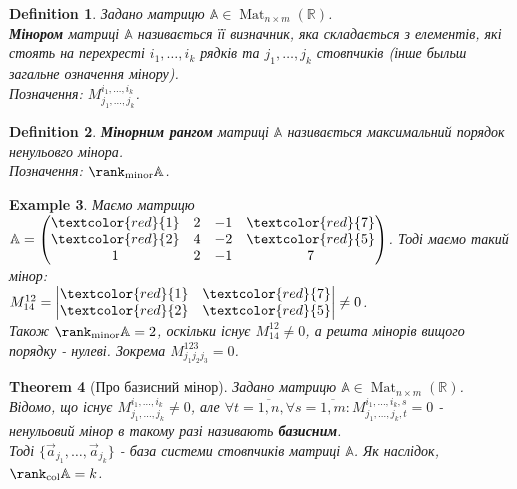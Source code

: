 \documentclass[a4paper, 10pt]{article}
\theoremstyle{theoremdd}
\newtheorem{theorem}{Theorem}[subsection]
\newtheorem{definition}[theorem]{Definition}
\newtheorem{example}[theorem]{Example}
\DeclareMathOperator{\Mat}{Mat}
\begin{document}
\begin{definition}
Задано матрицю $\mathbb{A} \in \Mat_{n \times m}(\mathbb{R})$.\\
\textbf{Мінором} матриці $\mathbb{A}$ називається її визначник, яка складається з елементів, які стоять на перехресті $i_1,\dots,i_k$ рядків та $j_1,\dots,j_k$ стовпчиків (інше быльш загальне означення мінору).\\
Позначення: $M_{j_1,\dots,j_k}^{i_1,\dots,i_k}$.
\end{definition}

\begin{definition}
\textbf{Мінорним рангом} матриці $\mathbb{A}$ називається максимальний порядок ненульовго мінора.\\
Позначення: $\rank_{\textrm{minor}} \mathbb{A}$.
\end{definition}

\begin{example}
Маємо матрицю $\mathbb{A} = \begin{pmatrix}
\textcolor{red}{1} & 2 & -1 & \textcolor{red}{7} \\
\textcolor{red}{2} & 4 & -2 & \textcolor{red}{5} \\
1 & 2 & -1 & 7
\end{pmatrix}$. Тоді маємо такий мінор:\\
$M_{14}^{12} = \begin{vmatrix}
\textcolor{red}{1} & \textcolor{red}{7} \\
\textcolor{red}{2} & \textcolor{red}{5}
\end{vmatrix} \neq 0$.\\
Також $\rank_{\text{minor}} \mathbb{A} = 2$, оскільки існує $M_{14}^{12} \neq 0$, а решта мінорів вищого порядку - нулеві. Зокрема $M^{123}_{j_1j_2j_3} = 0$.
\end{example}

\begin{theorem}[Про базисний мінор]
Задано матрицю $\mathbb{A} \in \Mat_{n \times m}(\mathbb{R})$. Відомо, що існує $M_{j_1,\dots,j_k}^{i_1,\dots,i_k} \neq 0$, але $\forall t = \overline{1,n}, \forall s = \overline{1,m}: M_{j_1,\dots,j_k,t}^{i_1,\dots,i_k,s} = 0$ - ненульовий мінор в такому разі називають \textbf{базисним}. \\
Тоді $\{\vec{a}_{j_1},\dots,\vec{a}_{j_k}\}$ - база системи стовпчиків матриці $\mathbb{A}$. Як наслідок, $\rank_{\text{col}} \mathbb{A} = k$.
\end{theorem}
\end{document}

